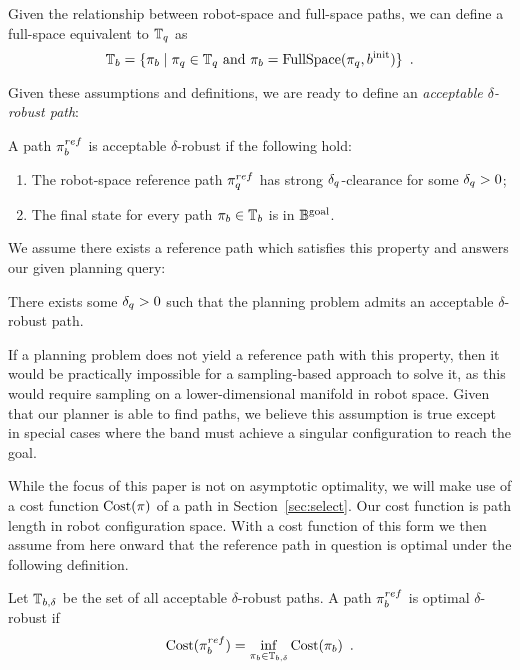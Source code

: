 Given the relationship between robot-space and full-space paths, we can define a full-space equivalent to $\mathbb{T}_q$ as
\begin{equation}
    \mathbb{T}_b = \{ \pi_{b} \mid \pi_{q} \in \mathbb{T}_q \textrm{ and } \pi_{b} = \textrm{FullSpace}(\pi_{q}, b^\textrm{init}) \} \enspace .
\end{equation}

Given these assumptions and definitions, we are ready to define an \textit{acceptable $\delta$-robust path}:
\begin{definition}
\label{def:robust}
A path $\pi_{b}^{ref}$ is acceptable $\delta$-robust if the following hold:
\begin{enumerate}
    \item The robot-space reference path $\pi_{q}^{ref}$ has strong $\delta_q$-clearance for some $\delta_q > 0$;
    \item The final state for every path $\pi_{b} \in \mathbb{T}_b$ is in $\mathbb{B}^\textrm{goal}$. 
\end{enumerate}
\end{definition}
\noindent We assume there exists a reference path which satisfies this property and answers our given planning query:

\begin{assumption}
    There exists some $\delta_q > 0$ such that the planning problem admits an acceptable $\delta$-robust path.
    \label{ass:solvable_problem}
\end{assumption}

If a planning problem does not yield a reference path with this property, then it would be practically impossible for a sampling-based approach to solve it, as this would require sampling on a lower-dimensional manifold in robot space. Given that our planner is able to find paths, we believe this assumption is true except in special cases where the band must achieve a singular configuration to reach the goal.


While the focus of this paper is not on asymptotic optimality, we will make use of a cost function $\textrm{Cost}(\pi)$ of a path in Section~\ref{sec:select}. Our cost function is path length in robot configuration space. With a cost function of this form we then assume from here onward that the reference path in question is optimal under the following definition.

\begin{definition}
    Let $\mathbb{T}_{b,\delta}$ be the set of all acceptable $\delta$-robust paths. A path $\pi_{b}^{ref}$ is optimal $\delta$-robust if
    \begin{equation}
        \textrm{Cost}(\pi_{b}^{ref}) = \inf_{\pi_{b} \in \mathbb{T}_{b,\delta}} \textrm{Cost}(\pi_{b}) \enspace .
    \end{equation}
\end{definition}

